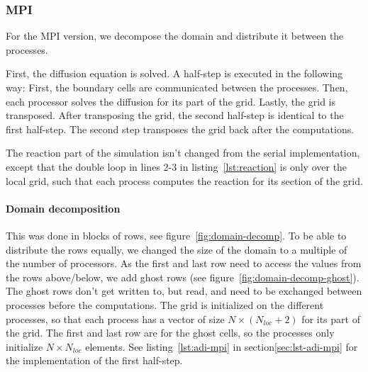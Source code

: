 \documentclass[a4paper]{article}
\begin{document}
\subsubsection{MPI}
For the MPI version, we decompose the domain and distribute it between the processes.

First, the diffusion equation is solved.
A half-step is executed in the following way: First, the boundary cells are communicated between the processes.
Then, each processor solves the diffusion for its part of the grid.
Lastly, the grid is transposed.
After transposing the grid, the second half-step is identical to the first half-step.
The second step transposes the grid back after the computations.

The reaction part of the simulation isn't changed from the serial implementation, except that the double loop in lines 2-3 in listing~\ref{lst:reaction} is only over the local grid, such that each process computes the reaction for its section of the grid.


\paragraph{Domain decomposition}\label{sec:domain-decomp}

This was done in blocks of rows, see figure~\ref{fig:domain-decomp}.
To be able to distribute the rows equally, we changed the size of the domain to a multiple of the number of processors.
As the first and last row need to access the values from the rows above/below, we add ghost rows (see figure~\ref{fig:domain-decomp-ghost}).
The ghost rows don't get written to, but read, and need to be exchanged between processes before the computations.
The grid is initialized on the different processes, so that each process has a vector of size $N \times (N_{loc}+2)$ for its part of the grid.
The first and last row are for the ghost cells, so the processes only initialize $N \times N_{loc}$ elements.
See listing~\ref{lst:adi-mpi} in section\ref{sec:lst-adi-mpi} for the implementation of the first half-step.
\end{document}
